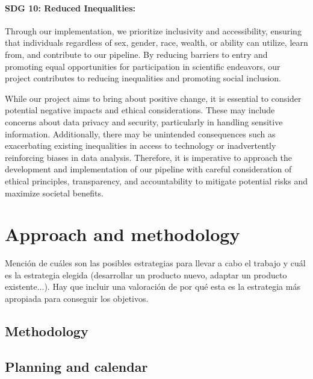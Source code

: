 \documentclass[ENG, BIB]{TFUOC}%
\begin{document}
\subsubsection{SDG 10: Reduced Inequalities:} 

Through our implementation, we prioritize inclusivity and accessibility, ensuring that individuals regardless of sex, gender, race, wealth, or ability can utilize, learn from, and contribute to our pipeline. By reducing barriers to entry and promoting equal opportunities for participation in scientific endeavors, our project contributes to reducing inequalities and promoting social inclusion. 

\vspace{18pt}

While our project aims to bring about positive change, it is essential to consider potential negative impacts and ethical considerations. These may include concerns about data privacy and security, particularly in handling sensitive information. Additionally, there may be unintended consequences such as exacerbating existing inequalities in access to technology or inadvertently reinforcing biases in data analysis. Therefore, it is imperative to approach the development and implementation of our pipeline with careful consideration of ethical principles, transparency, and accountability to mitigate potential risks and maximize societal benefits.

\chapter{Approach and methodology}

Mención de cuáles son las posibles estrategias para llevar a cabo el trabajo y cuál es la estrategia elegida (desarrollar un producto nuevo, adaptar un producto existente...). Hay que incluir una valoración de por qué esta es la estrategia más apropiada para conseguir los objetivos.   	

\section{Methodology}

\section{Planning and calendar}
\end{document}
